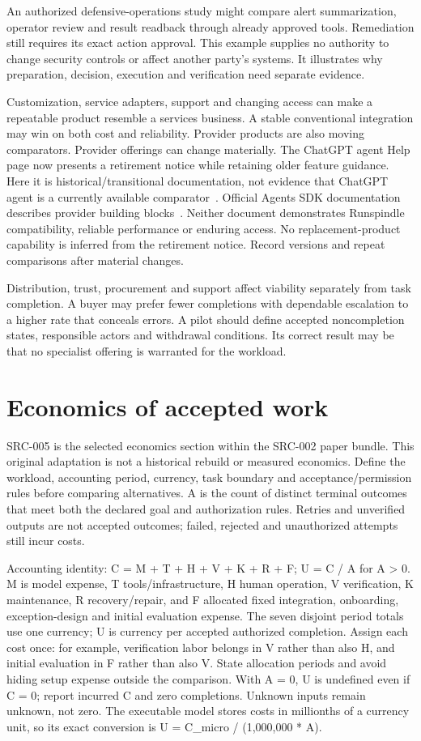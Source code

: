 \documentclass[11pt,letterpaper]{article}
\begin{document}
An authorized defensive-operations study might compare alert summarization,
operator review and result readback through already approved tools. Remediation
still requires its exact action approval. This example supplies no authority to
change security controls or affect another party's systems. It illustrates why
preparation, decision, execution and verification need separate evidence.

Customization, service adapters, support and changing access can make a repeatable
product resemble a services business. A stable conventional integration may win
on both cost and reliability. Provider products are also moving comparators.
Provider offerings can change materially. The ChatGPT agent Help page now
presents a retirement notice while retaining older feature guidance. Here it is
historical/transitional documentation, not evidence that ChatGPT agent is a
currently available comparator~\cite{chatgptagent}. Official Agents SDK
documentation describes provider building blocks~\cite{openaiagents}. Neither
document demonstrates Runspindle compatibility, reliable performance or enduring
access. No replacement-product capability is inferred from the retirement
notice. Record versions and repeat comparisons after material changes.

Distribution, trust, procurement and support affect viability separately from
task completion. A buyer may prefer fewer completions with dependable escalation
to a higher rate that conceals errors. A pilot should define accepted
noncompletion states, responsible actors and withdrawal conditions. Its correct
result may be that no specialist offering is warranted for the workload.

\section{Economics of accepted work}
SRC-005 is the selected economics section within the SRC-002 paper bundle. This original adaptation is not a historical rebuild or measured economics. Define the workload, accounting period, currency, task boundary and acceptance/permission rules before comparing alternatives. A is the count of distinct terminal outcomes that meet both the declared goal and authorization rules. Retries and unverified outputs are not accepted outcomes; failed, rejected and unauthorized attempts still incur costs.

Accounting identity: C = M + T + H + V + K + R + F; U = C / A for A > 0. M is model expense, T tools/infrastructure, H human operation, V verification, K maintenance, R recovery/repair, and F allocated fixed integration, onboarding, exception-design and initial evaluation expense. The seven disjoint period totals use one currency; U is currency per accepted authorized completion. Assign each cost once: for example, verification labor belongs in V rather than also H, and initial evaluation in F rather than also V. State allocation periods and avoid hiding setup expense outside the comparison. With A = 0, U is undefined even if C = 0; report incurred C and zero completions. Unknown inputs remain unknown, not zero. The executable model stores costs in millionths of a currency unit, so its exact conversion is U = C\_micro / (1,000,000 * A).
\end{document}
